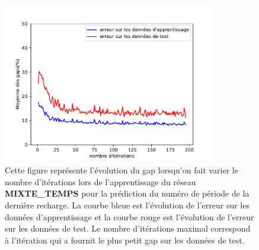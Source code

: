 %
%

\begin{figure}[H]
	\centerline{
		\includegraphics[height=7cm]{images_these/Gap_time_prediction_reseaufonctionnel_testtrain_data.pdf}}
	\caption[Le gap du réseau MIXTE\_TEMPS]{Cette figure représente l'évolution du gap lorsqu'on fait varier le nombre d'itérations lors de l'apprentissage du réseau \textbf{MIXTE\_TEMPS} pour la prédiction du numéro de période de la dernière recharge. La courbe bleue est l'évolution de l'erreur sur les données d'apprentissage et la courbe rouge est l'évolution de l'erreur sur les données de test. Le nombre d'itérations maximal correspond à l'itération qui a fournit le plus petit gap sur les données de test.}
	\label{time_6000_loss_prediction_courbe_Al_He_}
\end{figure}




